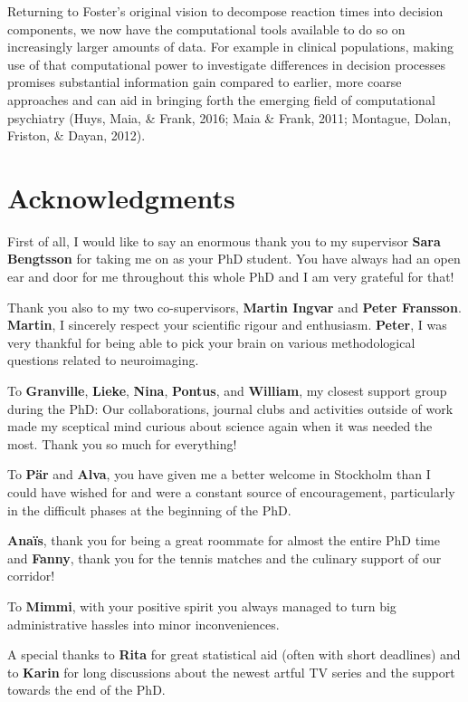 \documentclass[12pt,openany]{book}
\theoremstyle{definition}
\theoremstyle{definition}
\theoremstyle{definition}
\theoremstyle{remark}
\begin{document}
Returning to Foster's original vision to decompose reaction times into
decision components, we now have the computational tools available to do
so on increasingly larger amounts of data. For example in clinical
populations, making use of that computational power to investigate
differences in decision processes promises substantial information gain
compared to earlier, more coarse approaches and can aid in bringing
forth the emerging field of computational psychiatry (Huys, Maia, \&
Frank, 2016; Maia \& Frank, 2011; Montague, Dolan, Friston, \& Dayan,
2012).

\chapter*{Acknowledgments}\label{acknowledgments}

First of all, I would like to say an enormous thank you to my supervisor
\textbf{Sara Bengtsson} for taking me on as your PhD student. You have
always had an open ear and door for me throughout this whole PhD and I
am very grateful for that!

Thank you also to my two co-supervisors, \textbf{Martin Ingvar} and
\textbf{Peter Fransson}. \textbf{Martin}, I sincerely respect your
scientific rigour and enthusiasm. \textbf{Peter}, I was very thankful
for being able to pick your brain on various methodological questions
related to neuroimaging.

To \textbf{Granville}, \textbf{Lieke}, \textbf{Nina}, \textbf{Pontus},
and \textbf{William}, my closest support group during the PhD: Our
collaborations, journal clubs and activities outside of work made my
sceptical mind curious about science again when it was needed the most.
Thank you so much for everything!

To \textbf{Pär} and \textbf{Alva}, you have given me a better welcome in
Stockholm than I could have wished for and were a constant source of
encouragement, particularly in the difficult phases at the beginning of
the PhD.

\textbf{Anaïs}, thank you for being a great roommate for almost the
entire PhD time and \textbf{Fanny}, thank you for the tennis matches and
the culinary support of our corridor!

To \textbf{Mimmi}, with your positive spirit you always managed to turn
big administrative hassles into minor inconveniences.

A special thanks to \textbf{Rita} for great statistical aid (often with
short deadlines) and to \textbf{Karin} for long discussions about the
newest artful TV series and the support towards the end of the PhD.
\end{document}
